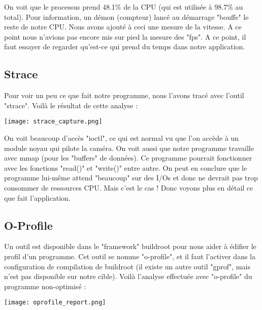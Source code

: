 On voit que le processus prend 48.1\% de la CPU (qui est utilisée à 98.7\% au total). Pour information, un démon (compteur) lancé au démarrage "bouffe" le reste de notre CPU. Nous avons ajouté à ceci une mesure de la vitesse. A ce point nous n'avions pas encore mis sur pied la mesure des "fps". A ce point, il faut essayer de regarder qu'est-ce qui prend du temps dans notre application.



\pagebreak \subsection{Strace}

Pour voir un peu ce que fait notre programme, nous l'avons tracé avec l'outil "strace". Voilà le résultat de cette analyse :

\begin{center} 
\hspace{12.45cm}
\texttt{[image: strace\_capture.png]}
\end{center}
\vspace{0.5cm}

On voit beaucoup d'accès "ioctl", ce qui est normal vu que l'on accède à un module noyau qui pilote la caméra. On voit aussi que notre programme travaille avec mmap (pour les "buffers" de données). Ce programme pourrait fonctionner avec les fonctions "read()" et "write()" entre autre. On peut en conclure que le programme lui-même attend "beaucoup" sur des I/Os et donc ne devrait pas trop consommer de ressources CPU. Mais c'est le cas ! Donc voyons plus en détail ce que fait l'application.


\pagebreak \subsection{O-Profile}

Un outil est disponible dans le "framework" buildroot pour nous aider à édifier le profil d'un programme. Cet outil se nomme "o-profile", et il faut l'activer dans la configuration de compilation de buildroot (il existe un autre outil "gprof", mais n'est pas disponible sur notre cible). Voilà l'analyse effectuée avec "o-profile" du programme non-optimisé :

\begin{center} 
\hspace{12.45cm}
\texttt{[image: oprofile\_report.png]}
\end{center}
\vspace{0.5cm}

